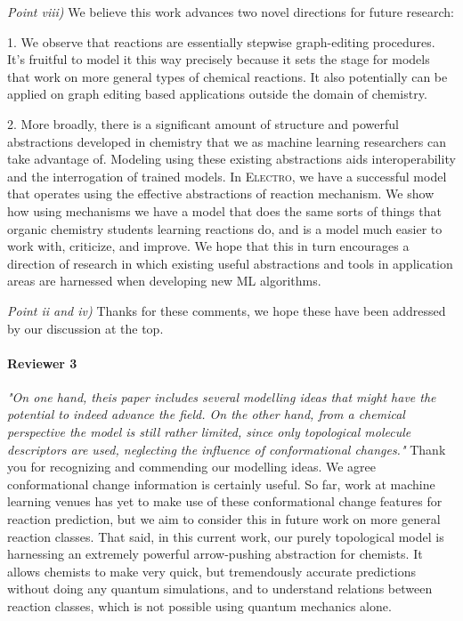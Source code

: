 \documentclass{article}
\newcommand{\ourModel}{\textsc{Electro}}
\begin{document}
\emph{Point viii)}
We believe this work advances two novel directions for future research:

 1. We observe that reactions are essentially stepwise graph-editing procedures. 
 It’s fruitful to model it this way precisely because it sets the stage for models that work on more general types of chemical reactions.
It also potentially can be applied on graph editing based applications outside the domain of chemistry.

  2. More broadly, there is a significant amount of structure and powerful abstractions developed in chemistry that we as machine learning researchers can take advantage of. 
Modeling using these existing abstractions aids interoperability and the interrogation of trained models.
In \ourModel, we have a successful model that operates using the effective abstractions of reaction mechanism.
We show how using mechanisms we have a model that does the same sorts of things that organic chemistry students learning reactions do, and is a model much easier to work with, criticize, and improve. 
We hope that this in turn encourages a direction of research in which existing useful abstractions and tools in application areas are harnessed when developing new ML algorithms.

 
\emph{Point ii and iv)} Thanks for these comments, we hope these have been addressed by our discussion at the top.



\paragraph{Reviewer 3}
\emph{"On one hand, theis paper includes several modelling ideas that might have the potential to indeed advance the field. On the other hand, from a chemical perspective the model is still rather limited, since only topological molecule descriptors are used, neglecting the influence of conformational changes."}
Thank you for recognizing and commending our modelling ideas. We agree conformational change information is certainly useful. So far, work at machine learning venues has yet to make use of these conformational change features for reaction prediction, but we aim to consider this in future work on more general reaction classes. That said, in this current work, our purely topological model is harnessing an extremely powerful arrow-pushing abstraction for chemists. It allows chemists to make very quick, but tremendously accurate predictions without doing any quantum simulations, and to understand relations between reaction classes, which is not possible using quantum mechanics alone. 
\end{document}
